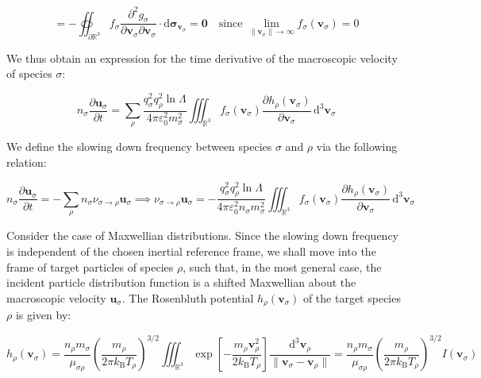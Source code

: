 \begin{equation}
    =-\oiint_{\partial\mathbb{R}^3}f_\sigma\frac{\partial^2g_\sigma}{\partial\mathbf{v}_\sigma\partial\mathbf{v}_\sigma}\cdot\mathrm{d}\boldsymbol{\sigma}_{\mathbf{v}_\sigma}=\mathbf{0}\quad\text{since }\lim_{\|\mathbf{v}_\sigma\|\to\infty}f_\sigma(\mathbf{v}_\sigma)=0
\end{equation}

We thus obtain an expression for the time derivative of the macroscopic velocity of species $\sigma$:

\begin{equation}
    n_\sigma\frac{\partial\mathbf{u}_\sigma}{\partial t}=\sum_\rho\frac{q_\sigma^2q_\rho^2\ln{\Lambda}}{4\pi\varepsilon_0^2m_\sigma^2}\iiint_{\mathbb{R}^3}f_\sigma(\mathbf{v}_\sigma)\frac{\partial h_\rho(\mathbf{v}_\sigma)}{\partial\mathbf{v}_\sigma}\,\mathrm{d}^3\mathbf{v}_\sigma
\end{equation}

We define the slowing down frequency between species $\sigma$ and $\rho$ via the following relation:

\begin{equation}
    n_\sigma\frac{\partial\mathbf{u}_\sigma}{\partial t}=-\sum_{\rho}n_\sigma\nu_{\sigma\to\rho}\mathbf{u}_\sigma\implies\nu_{\sigma\to\rho}\mathbf{u}_\sigma=-\frac{q_\sigma^2q_\rho^2\ln{\Lambda}}{4\pi\varepsilon_0^2n_\sigma m_\sigma^2}\iiint_{\mathbb{R}^3}f_\sigma(\mathbf{v}_\sigma)\frac{\partial h_\rho(\mathbf{v}_\sigma)}{\partial\mathbf{v}_\sigma}\,\mathrm{d}^3\mathbf{v}_\sigma
\end{equation}

Consider the case of Maxwellian distributions. Since the slowing down frequency is independent of the chosen inertial reference frame, we shall move into the frame of target particles of species $\rho$, such that, in the most general case, the incident particle distribution function is a shifted Maxwellian about the macroscopic velocity $\mathbf{u}_\sigma$. The Rosenbluth potential $h_\rho(\mathbf{v}_\sigma)$ of the target species $\rho$ is given by:

\begin{equation}
    h_\rho(\mathbf{v}_\sigma)=\frac{n_\rho m_\sigma}{\mu_{\sigma\rho}}\left(\frac{m_\rho}{2\pi k_\mathrm{B}T_\rho}\right)^{3/2}\iiint_{\mathbb{R}^3}\exp{\left[-\frac{m_\rho\mathbf{v}_\rho^2}{2k_\mathrm{B}T_\rho}\right]}\frac{\mathrm{d}^3\mathbf{v}_\rho}{\|\mathbf{v}_\sigma-\mathbf{v}_\rho\|}=\frac{n_\rho m_\sigma}{\mu_{\sigma\rho}}\left(\frac{m_\rho}{2\pi k_\mathrm{B}T_\rho}\right)^{3/2}I(\mathbf{v}_\sigma)
\end{equation}

